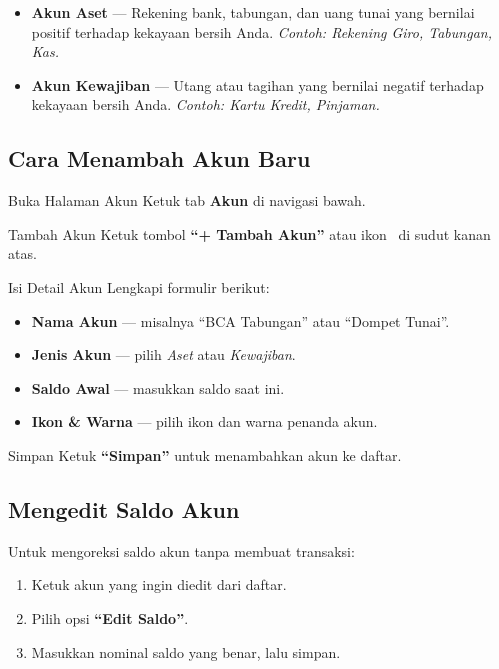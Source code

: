 \documentclass[12pt, a4paper]{article}
\begin{document}
\begin{itemize}[leftmargin=1.5em, itemsep=4pt]
  \item \textbf{Akun Aset} --- Rekening bank, tabungan, dan uang tunai yang bernilai positif terhadap kekayaan bersih Anda. \textit{Contoh: Rekening Giro, Tabungan, Kas.}
  \item \textbf{Akun Kewajiban} --- Utang atau tagihan yang bernilai negatif terhadap kekayaan bersih Anda. \textit{Contoh: Kartu Kredit, Pinjaman.}
\end{itemize}

\subsection{Cara Menambah Akun Baru}

\begin{stepbox}{Buka Halaman Akun}
  Ketuk tab \textbf{Akun} di navigasi bawah.
\end{stepbox}

\begin{stepbox}{Tambah Akun}
  Ketuk tombol \textbf{``+ Tambah Akun''} atau ikon \faPlus\ di sudut kanan atas.
\end{stepbox}

\begin{stepbox}{Isi Detail Akun}
  Lengkapi formulir berikut:
  \begin{itemize}[leftmargin=1em, itemsep=2pt]
    \item \textbf{Nama Akun} --- misalnya ``BCA Tabungan'' atau ``Dompet Tunai''.
    \item \textbf{Jenis Akun} --- pilih \textit{Aset} atau \textit{Kewajiban}.
    \item \textbf{Saldo Awal} --- masukkan saldo saat ini.
    \item \textbf{Ikon \& Warna} --- pilih ikon dan warna penanda akun.
  \end{itemize}
\end{stepbox}

\begin{stepbox}{Simpan}
  Ketuk \textbf{``Simpan''} untuk menambahkan akun ke daftar.
\end{stepbox}

\subsection{Mengedit Saldo Akun}

Untuk mengoreksi saldo akun tanpa membuat transaksi:
\begin{enumerate}[leftmargin=1.5em]
  \item Ketuk akun yang ingin diedit dari daftar.
  \item Pilih opsi \textbf{``Edit Saldo''}.
  \item Masukkan nominal saldo yang benar, lalu simpan.
\end{enumerate}
\end{document}
